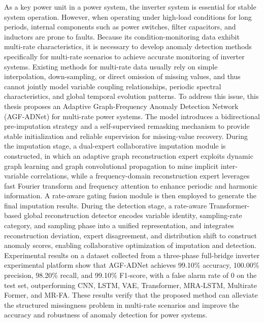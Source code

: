 \documentclass[bachelor, vlined]{DissertUESTC}
\begin{document}
	As a key power unit in a power system, the inverter system is essential for stable system operation. However, when operating under high-load conditions for long periods, internal components such as power switches, filter capacitors, and inductors are prone to faults. Because its condition-monitoring data exhibit multi-rate characteristics, it is necessary to develop anomaly detection methods specifically for multi-rate scenarios to achieve accurate monitoring of inverter systems. Existing methods for multi-rate data usually rely on simple interpolation, down-sampling, or direct omission of missing values, and thus cannot jointly model variable coupling relationships, periodic spectral characteristics, and global temporal evolution patterns. To address this issue, this thesis proposes an Adaptive Graph-Frequency Anomaly Detection Network (AGF-ADNet) for multi-rate power systems. The model introduces a bidirectional pre-imputation strategy and a self-supervised remasking mechanism to provide stable initialization and reliable supervision for missing-value recovery. During the imputation stage, a dual-expert collaborative imputation module is constructed, in which an adaptive graph reconstruction expert exploits dynamic graph learning and graph convolutional propagation to mine implicit inter-variable correlations, while a frequency-domain reconstruction expert leverages fast Fourier transform and frequency attention to enhance periodic and harmonic information. A rate-aware gating fusion module is then employed to generate the final imputation results. During the detection stage, a rate-aware Transformer-based global reconstruction detector encodes variable identity, sampling-rate category, and sampling phase into a unified representation, and integrates reconstruction deviation, expert disagreement, and distribution shift to construct anomaly scores, enabling collaborative optimization of imputation and detection. Experimental results on a dataset collected from a three-phase full-bridge inverter experimental platform show that AGF-ADNet achieves 99.10\% accuracy, 100.00\% precision, 98.20\% recall, and 99.10\% F1-score, with a false alarm rate of 0 on the test set, outperforming CNN, LSTM, VAE, Transformer, MRA-LSTM, Multirate Former, and MR-FA. These results verify that the proposed method can alleviate the structured missingness problem in multi-rate scenarios and improve the accuracy and robustness of anomaly detection for power systems.
	
\end{document}
